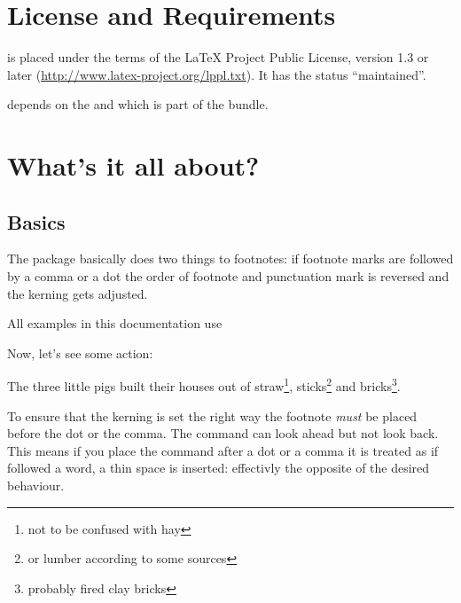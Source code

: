 \documentclass[toc=index,toc=bib]{cnpkgdoc}
\renewcommand\thempfootnote{\arabic{mpfootnote}}
\begin{document}
\section{License and Requirements}
\fnpct is placed under the terms of the LaTeX Project Public License,
version 1.3 or later (\url{http://www.latex-project.org/lppl.txt}).
It has the status \enquote{maintained}.

\fnpct depends on the  and  which is part of the
 bundle.

\section{What's it all about?}
\subsection{Basics}
The \fnpct package basically does two things to footnotes: if footnote marks are
followed by a comma or a dot the order of footnote and punctuation mark is reversed
and the kerning gets adjusted.

All examples in this documentation use
\begin{beispiel}
 \renewcommand\thempfootnote{\arabic{mpfootnote}}
\end{beispiel}

Now, let's see some action:
\begin{beispiel}
 \begin{minipage}{.4\linewidth}
  \noindent The three little pigs built their houses
  out of straw\footnote{not to be confused with hay},
  sticks\footnote{or lumber according to some sources}
  and bricks\footnote{probably fired clay bricks}.
 \end{minipage}
\end{beispiel}

To ensure that the kerning is set the right way the footnote \emph{must} be placed
before the dot or the comma. The command can look ahead but not look back. This means
if you place the  command after a dot or a comma it is treated as if
followed a word, \ie a thin space is inserted: effectivly the opposite of the
desired behaviour.
\end{document}
